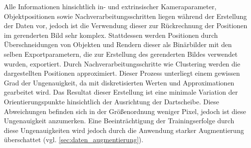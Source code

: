 Alle Informationen hinsichtlich in- und extrinsischer Kameraparameter, Objektpositionen sowie Nachverarbeitungsschritten liegen während der Erstellung der Daten vor, jedoch ist die Verwendung dieser zur Rückrechnung der Positionen im gerenderten Bild sehr komplex. Stattdessen werden Positionen durch Überschneidungen von Objekten und Rendern dieser als Binärbilder mit den selben Exportparametern, die zur Erstellung des gerenderten Bildes verwendet wurden, exportiert. Durch Nachverarbeitungsschritte wie Clustering werden die dargestellten Positionen approximiert. Dieser Prozess unterliegt einem gewissen Grad der Ungenauigkeit, da mit diskretisierten Werten und Approximationen gearbeitet wird. Das Resultat dieser Erstellung ist eine minimale Variation der Orientierungspunkte hinsichtlich der Ausrichtung der Dartscheibe. Diese Abweichungen befinden sich in der Größenordnung weniger Pixel, jedoch ist diese Ungenauigkeit anzumerken. Eine Beeinträchtigung der Trainingserfolge durch diese Ungenauigkeiten wird jedoch durch die Anwendung starker Augmentierung überschattet (vgl. \autoref{sec:daten_augmentierung}).
